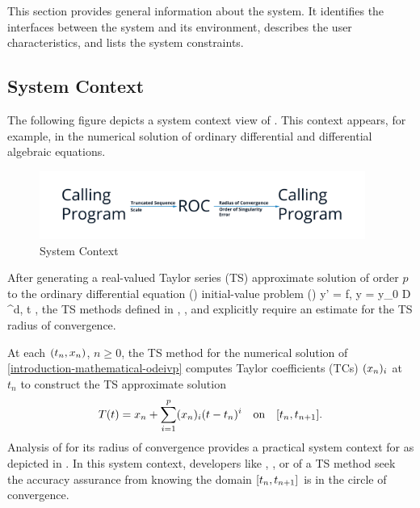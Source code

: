 \documentclass[12pt]{article}
\begin{document}
This section provides general information about the system.  It identifies the
interfaces between the system and its environment, describes the user
characteristics, and lists the system constraints.  

\subsection{System Context}\label{ssc:systemcontext}

The following figure depicts a system context view of . This
context appears, for example, in the numerical solution of ordinary differential and
differential algebraic equations.

\begin{figure}[h!]
\begin{center}
 \includegraphics[width=0.95\textwidth]{roc-system-context}
\caption{System Context}
\label{fg:systemcontext} 
\end{center}
\end{figure}

After generating a real-valued Taylor series (TS) approximate solution of order $p$ to the
ordinary differential equation (\ode) initial-value problem (\ivp) 
\EQ
{
  \label{eq:introduction-mathematical-odeivp}
  y' = f,
  \quad
  y = y_0 \in \mathcal D \subset \Rz^d,
  \quad
  t \in \iode \subset \Rz,
}
the TS methods defined in
\cite{jorba2005software},
\cite{bergsma2016application},
and \cite{chang1982} explicitly require an estimate for the TS radius of convergence.

At each $( {t_n,x_n} )$, $n \geq 0$, the TS method for the numerical solution
of \eqref{introduction-mathematical-odeivp} computes Taylor coefficients (TCs)
$(x_{n})_{i}$ at $t_{n}$ to construct the TS approximate solution
\begin{align}
  \label{eq:tss}
  \Tp(t) = \xn + \sum_{i=1}^{p}\tc{\xn}{i}(t-\tn)^{i} \quad\mbox{on}\quad \lode.
\end{align}
Analysis of  for its radius of convergence provides a practical system
context for  as depicted in .
In this system context, developers like \cite{bergsma2016application},
\cite{jorba2005software}, or \cite{chang1982} of a TS method seek the accuracy
assurance from knowing the domain $\lode$ is in the circle of convergence.
\end{document}
